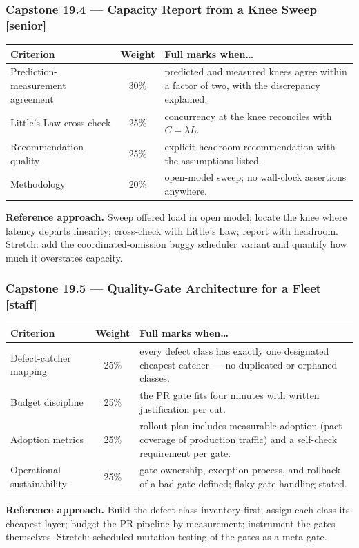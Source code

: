 \subsubsection*{Capstone 19.4 --- Capacity Report from a Knee Sweep [senior]}
\begin{center}\small
\begin{tabularx}{\textwidth}{l c X}
\toprule
\textbf{Criterion} & \textbf{Weight} & \textbf{Full marks when\ldots} \\
\midrule
Prediction-measurement agreement & 30\% & predicted and measured knees agree within a factor of two, with the discrepancy explained. \\
Little's Law cross-check & 25\% & concurrency at the knee reconciles with $C=\lambda L$. \\
Recommendation quality & 25\% & explicit headroom recommendation with the assumptions listed. \\
Methodology & 20\% & open-model sweep; no wall-clock assertions anywhere. \\
\bottomrule
\end{tabularx}
\end{center}
\textbf{Reference approach.} Sweep offered load in open model; locate the
knee where latency departs linearity; cross-check with Little's Law; report
with headroom. Stretch: add the coordinated-omission buggy scheduler
variant and quantify how much it overstates capacity.

\subsubsection*{Capstone 19.5 --- Quality-Gate Architecture for a Fleet [staff]}
\begin{center}\small
\begin{tabularx}{\textwidth}{l c X}
\toprule
\textbf{Criterion} & \textbf{Weight} & \textbf{Full marks when\ldots} \\
\midrule
Defect-catcher mapping & 25\% & every defect class has exactly one designated cheapest catcher --- no duplicated or orphaned classes. \\
Budget discipline & 25\% & the PR gate fits four minutes with written justification per cut. \\
Adoption metrics & 25\% & rollout plan includes measurable adoption (pact coverage of production traffic) and a self-check requirement per gate. \\
Operational sustainability & 25\% & gate ownership, exception process, and rollback of a bad gate defined; flaky-gate handling stated. \\
\bottomrule
\end{tabularx}
\end{center}
\textbf{Reference approach.} Build the defect-class inventory first; assign
each class its cheapest layer; budget the PR pipeline by measurement;
instrument the gates themselves. Stretch: scheduled mutation testing of the
gates as a meta-gate.

